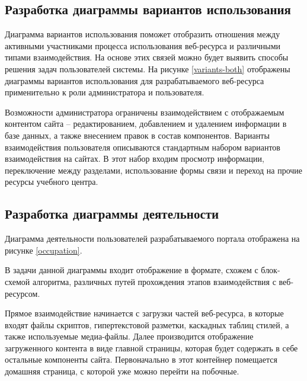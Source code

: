 \subsection{Разработка диаграммы вариантов использования}

Диаграмма вариантов использования поможет отобразить отношения между активными участниками процесса использования веб-ресурса и различными типами взаимодействия.
На основе этих связей можно будет выявить способы решения задач пользователей системы.
На рисунке \ref{variants-both} отображены диаграммы вариантов использования для разрабатываемого веб-ресурса применительно к роли администратора и пользователя.


Возможности администратора ограничены взаимодействием с отображаемым контентом сайта -- редактированием, добавлением и удалением информации в базе данных, а также внесением правок в состав компонентов.
Варианты взаимодействия пользователя описываются стандартным набором вариантов взаимодействия на сайтах.
В этот набор входим просмотр информации, переключение между разделами, использование формы связи и переход на прочие ресурсы учебного центра.

\subsection{Разработка диаграммы деятельности}

Диаграмма деятельности пользователей разрабатываемого портала отображена на рисунке \ref{occupation}.


В задачи данной диаграммы входит отображение в формате, схожем с блок-схемой алгоритма, различных путей прохождения этапов взаимодействия с веб-ресурсом.

Прямое взаимодействие начинается с загрузки частей веб-ресурса, в которые входят файлы скриптов, гипертекстовой разметки, каскадных таблиц стилей, а также используемые медиа-файлы.
Далее производится отображение загруженного контента в виде главной страницы, которая будет содержать в себе остальные компоненты сайта.
Первоначально в этот контейнер помещается домашняя страница, с которой уже можно перейти на побочные.

